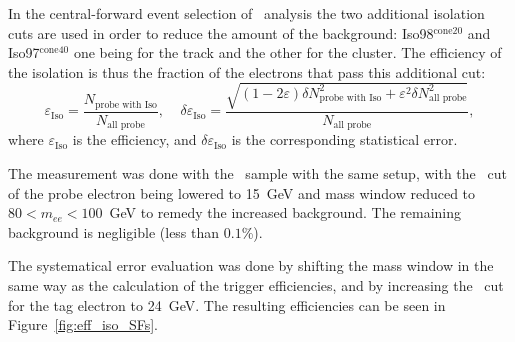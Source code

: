 In the central-forward event selection of \Zee\ analysis the two additional isolation cuts are used in order to reduce the amount of the background: Iso98\et$^{\mathrm{cone20}}$ and Iso97\pt$^{\mathrm{cone40}}$ one being for the track and the other for the cluster. The efficiency of the isolation is thus the fraction of the electrons that pass this additional cut:
\begin{equation}
\varepsilon_\mathrm{Iso} = \frac{N_\text{probe with Iso} }{ N_\text{all probe} }, \;\;\;\;
\delta \varepsilon_\mathrm{Iso} = \frac{\sqrt{(1-2\varepsilon) \delta N_\text{probe with Iso}^2 + \varepsilon^2 \delta N_\text{all probe}^2}}
                                {N_\text{all probe}},
\end{equation}
where $\varepsilon_\mathrm{Iso}$ is the efficiency, and $\delta \varepsilon_\mathrm{Iso}$ is the corresponding statistical error.

The measurement was done with the \Zee\ sample with the same setup, with the \pt\ cut of the probe electron being lowered to 15~GeV and mass window reduced to $80 < m_{ee} < 100$~GeV to remedy the increased background. The remaining background is negligible (less than $0.1$\%).

The systematical error evaluation was done by shifting the mass window in the same way as the calculation of the trigger efficiencies, and by increasing the \pt\ cut for the tag electron to 24~GeV. The resulting efficiencies can be seen in Figure~\ref{fig:eff_iso_SFs}.

\begin{figure}
\end{figure}
